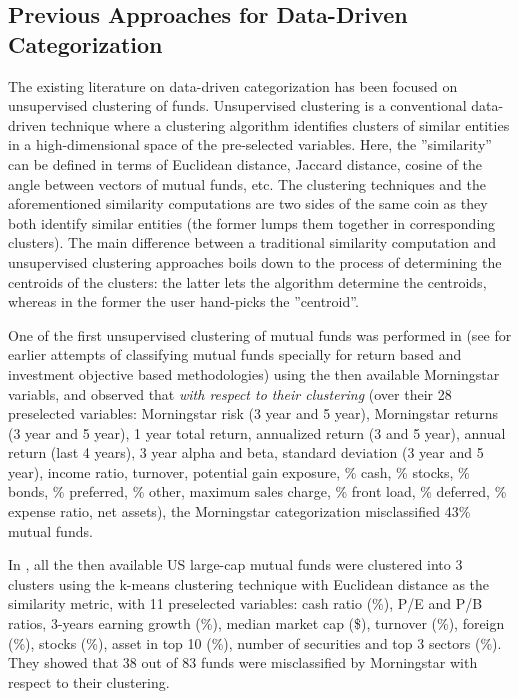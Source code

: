 \documentclass[sigconf]{acmart}
\begin{document}
\subsection{Previous Approaches for Data-Driven Categorization}
The existing literature on data-driven categorization has been focused on unsupervised clustering of funds. Unsupervised clustering \cite{cai2016clustering} is a conventional data-driven technique where a clustering algorithm identifies clusters of similar entities in a high-dimensional space of the pre-selected variables. Here, the ''similarity'' can be defined in terms of Euclidean distance, Jaccard distance, cosine of the angle between vectors of mutual funds, etc. The clustering techniques and the aforementioned similarity computations are two sides of the same coin as they both identify similar entities (the former lumps them together in corresponding clusters). The main difference between a traditional similarity computation and unsupervised clustering approaches boils down to the process of determining the centroids of the clusters: the latter lets the algorithm determine the centroids, whereas in the former the user hand-picks the ''centroid''. 


One of the first unsupervised clustering of mutual funds was performed in \cite{marathe1999categorizing} (see \cite{mcdonald1974objectives,martin1982fund,dibartolomeo1997mutual,sharpe1992asset} for earlier attempts of classifying mutual funds specially for return based and investment objective based methodologies) using the then available Morningstar variabls, and observed that \textit{with respect to their clustering} (over their 28 preselected variables: Morningstar risk (3 year and 5 year), Morningstar returns (3 year and 5 year), 1 year total return, annualized return (3 and 5 year), annual return (last 4 years), 3 year alpha and beta, standard deviation (3 year and 5 year), income ratio, turnover, potential gain exposure, \% cash, \% stocks, \% bonds, \% preferred, \% other, maximum sales charge, \% front load, \% deferred, \% expense ratio, net assets), the Morningstar categorization misclassified 43\% mutual funds. 

In \cite{haslem2001morningstar}, all the then available US large-cap mutual funds were clustered into 3 clusters using the k-means clustering technique with Euclidean distance as the similarity metric, with 11 preselected variables: cash ratio (\%), P/E and P/B ratios, 3-years earning growth (\%), median market cap (\$), turnover (\%), foreign (\%), stocks (\%), asset in top 10 (\%), number of securities and top 3 sectors (\%). They showed that 38 out of 83 funds were misclassified by Morningstar with respect to their clustering. 
\end{document}
